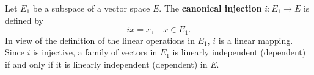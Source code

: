 Let $E_1$ be a subspace of a vector space $E$. The \textbf{canonical injection} $i: E_1 \to E$ is defined by
$$i x = x, \quad x \in E_1.$$
In view of the definition of the linear operations in $E_1$, $i$ is a linear mapping. Since $i$ is injective, a family of vectors in $E_1$ is linearly independent (dependent) if and only if it is linearly independent (dependent) in $E$.
